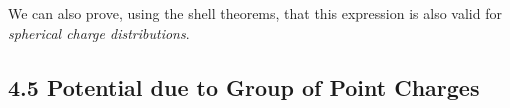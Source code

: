\documentclass[12pt, a4paper]{article}
\begin{document}
		We can also prove, using the shell theorems, that this expression is also valid for \textit{spherical charge distributions}.



		\subsection*{4.5 Potential due to Group of Point Charges}












	
\end{document}
